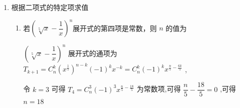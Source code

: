 \begin{enumerate}
\begin{enumerate}
\begin{jieda}
            令 ${21} - \dfrac{7}{2}r = 0$ ，解得 $r = 6,{{C}}_{7}^{6} \times  {\left( -1\right) }^{6} \times  {2}^{1} = {14}$
        \end{jieda}
        \item ${\left( \dfrac{x}{2} - \sqrt{x}\right) }^{6}$ 的展开式中， ${x}^{4}$ 的系数为
        \begin{jieda}
            由 ${T}_{k + 1} = {{C}}_{6}^{k}{\left( \dfrac{x}{2}\right) }^{6 - k}{\left( -\sqrt{x}\right) }^{k} = {\left( -1\right) }^{k}{\left( \dfrac{1}{2}\right) }^{6 - k}{{C}}_{6}^{k}{x}^{6 - \frac{k}{2}}$ ,
            
            当 $6 - \dfrac{k}{2} = 4$ ,解得 $k = 4$ ,
            
            所以 ${x}^{4}$ 的系数为 ${\left( -7\right) }^{4}{\left( \dfrac{1}{2}\right) }^{2}{{C}}_{6}^{4} = \dfrac{1}{4} \times  {15} = \dfrac{15}{4}$
        \end{jieda}
        \item 若 ${\left( 2x + \dfrac{1}{\sqrt[3]{x}}\right) }^{n}$ 的展开式中所有项系数和为 81,则该展开式的常数项为
        \begin{jieda}
            在 ${\left( 2x + \dfrac{1}{\sqrt[3]{x}}\right) }^{n}$ 的二项展开式中,令 $x = 1$ 得所有项的系数和为 ${3}^{n} = {81}$ ,解得 $n = 4$，于是得 ${\left( 2x + \dfrac{1}{\sqrt[3]{x}}\right) }^{4}$ 展开式的通项为 ${T}_{r + 1} = {C}_{4}^{r}{\left( 2x\right) }^{4 - r} \cdot  {\left( \dfrac{1}{\sqrt[3]{x}}\right) }^{r} = {2}^{4 - r} \cdot  {C}_{4}^{r}{x}^{4 - \frac{4}{3}},r \in  N,r \leq  4$，令 $4 - \dfrac{4}{3}r = 0$ ,得 $r = 3$ ,常数项为 $2{C}_{4}^{3} = 8$ .
        \end{jieda}
    \end{enumerate}

    
    
    \item 根据二项式的特定项求值
    \begin{enumerate}
        \item 若${\left( \sqrt[5]{x} - \dfrac{1}{x}\right) }^{n}$展开式的第四项是常数，则 $n$ 的值为
        \begin{jieda}
            ${\left( \sqrt[5]{x} - \dfrac{1}{x}\right) }^{n}$ 展开式的通项为 ${T}_{k + 1} = {C}_{n}^{k}{\left( {x}^{\frac{1}{5}}\right) }^{n - k}{\left( -1\right) }^{k}{x}^{-k} = {C}_{n}^{k}{\left( -1\right) }^{k}{x}^{\frac{n}{5} - \frac{6k}{5}}$ ,
            
            令 $k = 3$ 可得 ${T}_{4} = {C}_{n}^{3}{\left( -1\right) }^{3}{x}^{\frac{n}{5} - \frac{18}{5}}$ 为常数项,可得 $\dfrac{n}{5} - \dfrac{18}{5} = 0$ ,可得 $n = {18}$ 
        \end{jieda}


\end{enumerate}
\end{enumerate}
